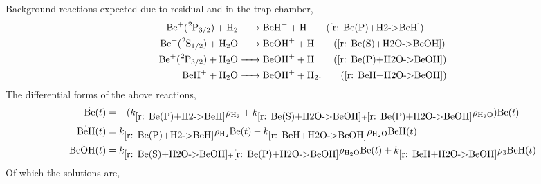 Background reactions expected due to residual  and  in the trap chamber,
\begin{align*}
	\ce{Be+(^2P3/2) + H2 & -> BeH+ + H} \tag{\ref{r: Be(P)+H2->BeH}} \\
	\ce{Be+(^2S1/2) + H2O & -> BeOH+ + H} \tag{\ref{r: Be(S)+H2O->BeOH}} \\
	\ce{Be+(^2P3/2) + H2O & -> BeOH+ + H} \tag{\ref{r: Be(P)+H2O->BeOH}} \\
	\ce{BeH+ + H2O & -> BeOH+ + H2}. \tag{\ref{r: BeH+H2O->BeOH}}
\end{align*}
The differential forms of the above reactions,
\begin{align*}
	\dot{\ce{Be}}(t) & = -(k_{\ref{r: Be(P)+H2->BeH}} \rho_{\ce{H2}} + k_{\ref{r: Be(S)+H2O->BeOH} + \ref{r: Be(P)+H2O->BeOH}} \rho_{\ce{H2O}}) \ce{Be}(t) \\
	\dot{\ce{BeH}}(t) & = k_{\ref{r: Be(P)+H2->BeH}} \rho_{\ce{H2}} \ce{Be}(t) - k_{\ref{r: BeH+H2O->BeOH}} \rho_{\ce{H2O}} \ce{BeH}(t) \\
	\dot{\ce{BeOH}}(t) & = k_{\ref{r: Be(S)+H2O->BeOH} + \ref{r: Be(P)+H2O->BeOH}} \rho_{\ce{H2O}} \ce{Be}(t) + k_{\ref{r: BeH+H2O->BeOH}} \rho_3 \ce{BeH}(t)
\end{align*}
Of which the solutions are,

